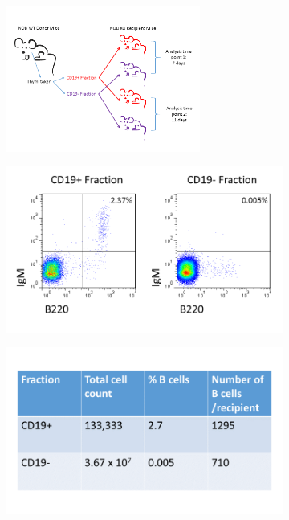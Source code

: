 \begin{figure}
	\begin{subfigure}{\textwidth}
	\centering
	\caption{}
	\includegraphics[width=0.7\textwidth]{Figures/KOTransferexptsetup.png}
	\label{fig:KOtransfersetup}
	\end{subfigure}
	\begin{subfigure}{0.5\textwidth}
	\caption{}
	\includegraphics[width=\textwidth]{Figures/NODdonor.png}
	\label{subfig:NODdonorseparation}
	\end{subfigure}
	\begin{subfigure}{0.5\textwidth}
	\centering
	\caption{}
	\includegraphics[width=\textwidth]{Figures/WTdonortable2.png}

\end{subfigure}
\end{figure}
